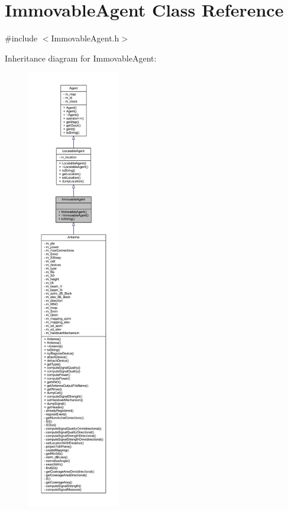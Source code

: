 \hypertarget{class_immovable_agent}{}\section{Immovable\+Agent Class Reference}
\label{class_immovable_agent}


{\ttfamily \#include $<$Immovable\+Agent.\+h$>$}



Inheritance diagram for Immovable\+Agent\+:
\nopagebreak
\begin{figure}[H]
\begin{center}
\leavevmode
\includegraphics[height=550pt]{class_immovable_agent__inherit__graph}
\end{center}
\end{figure}


